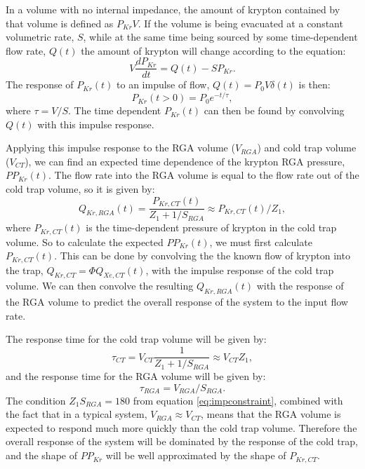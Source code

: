 In a volume with no internal impedance, the amount of krypton contained by that volume is defined as $P_{Kr}V$. If the volume is being evacuated at a constant volumetric rate, $S$, while at the same time being sourced by some time-dependent flow rate, $Q(t)$ the amount of krypton will change according to the equation:
\begin{equation}
\label{eq:expdiff}
V\frac{dP_{Kr}}{dt}=Q(t)-SP_{Kr}.
\end{equation}
The response of $P_{Kr}(t)$ to an impulse of flow, $Q(t)=P_0V\delta(t)$ is then:
\begin{equation}
P_{Kr}(t>0)=P_0e^{-t/\tau},
\end{equation}
where $\tau = V/S$. The time dependent $P_{Kr}(t)$ can then be found by convolving $Q(t)$ with this impulse response.

Applying this impulse response to the RGA volume ($V_{RGA}$) and cold trap volume ($V_{CT}$), we can find an expected time dependence of the krypton RGA pressure, $PP_{Kr}(t)$. The flow rate into the RGA volume is equal to the flow rate out of the cold trap volume, so it is given by:
\begin{equation}
Q_{Kr,RGA}(t)=\frac{P_{Kr,CT}(t)}{Z_1+1/S_{RGA}}\approx P_{Kr,CT}(t)/Z_1,
\end{equation}
where $P_{Kr,CT}(t)$ is the time-dependent pressure of krypton in the cold trap volume. So to calculate the expected $PP_{Kr}(t)$, we must first calculate $P_{Kr,CT}(t)$. This can be done by convolving the the known flow of krypton into the trap, $Q_{Kr,CT}=\Phi Q_{Xe,CT}(t)$, with the impulse response of the cold trap volume. We can then convolve the resulting $Q_{Kr,RGA}(t)$ with the response of the RGA volume to predict the overall response of the system to the input flow rate. 

The response time for the cold trap volume will be given by:
\begin{equation}
\tau_{CT}=V_{CT}\frac{1}{Z_1+1/S_{RGA}} \approx V_{CT}Z_1,
\label{eq:CTtime}
\end{equation}
and the response time for the RGA volume will be given by:
\begin{equation}
\tau_{RGA}=V_{RGA}/S_{RGA}.
\end{equation}
The condition $Z_1S_{RGA}=180$ from equation \ref{eq:impconstraint}, combined with the fact that in a typical system, $V_{RGA}\approx V_{CT}$, means that the RGA volume is expected to respond much more quickly than the cold trap volume. Therefore the overall response of the system will be dominated by the response of the cold trap, and the shape of $PP_{Kr}$ will be well approximated by the shape of $P_{Kr,CT}$.

